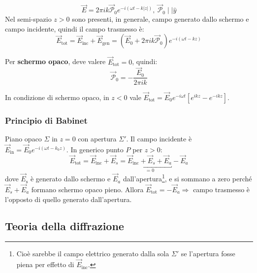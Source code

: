 \documentclass[10pt, a4paper]{scrartcl}
\numberwithin{equation}{subsection}
\theoremstyle{style1}
\newenvironment{boxenv}[1][]{
    \begin{eqbox}[#1]
    }{
   \end{eqbox}
}
\begin{document}
\begin{equation}
	\vec{E} = 2\pi i k \vec{\mathcal{P}}_0 e^{- i (\omega t - k|z|)} , \ \vec{\mathcal{P}}_0  \mid  \mid  \hat{y}
\end{equation}
Nel semi-spazio $z>0$ sono presenti, in generale, campo generato dallo schermo e campo incidente, quindi il campo trasmesso \`e:
\begin{equation}
	\vec{E}_\text{tot} = \vec{E}_\text{inc} + \vec{E}_\text{gen} = (\vec{E}_0 + 2\pi i k \vec{\mathcal{P}}_0) e^{-i(\omega t - kz)} 
\end{equation}
\begin{boxenv}[]
Per \textbf{schermo opaco}, deve valere $\vec{E}_\text{tot} =0 $, quindi:
\begin{equation}
	\vec{\mathcal{P}}_0 =  - \frac{\vec{E}_0}{2\pi i k}
\end{equation}
\end{boxenv}
\noindent In condizione di schermo opaco, in $z<0$ vale $\vec{E}_\text{tot}= \vec{E}_0 e^{-i\omega t}  \left[ e^{ikz} - e^{-ikz}  \right] $.

\subsubsection{Principio di Babinet}

Piano opaco $\Sigma$ in $z=0$ con apertura $\Sigma'$. Il campo incidente \`e $\vec{E}_\text{in} = \vec{E}_0 e^{-i(\omega t - k_0z)} $. In generico punto $P$ per $z>0$:
\begin{equation}
	\vec{E}_\text{tot} = \vec{E}_\text{inc} + \vec{E}_s = \underbracket{\vec{E}_\text{inc} + \vec{E}_s + \vec{E}_a}_{=0}  - \vec{E}_a
\end{equation}
dove $\vec{E}_\text{s}$ \`e generato dallo schermo e $\vec{E}_a$ dall'apertura\footnote{Cio\`e sarebbe il campo elettrico generato dalla sola $\Sigma'$ se l'apertura fosse piena per effetto di $\vec{E}_\text{inc}$.}, e si sommano a zero perch\'e $\vec{E}_s + \vec{E}_a$ formano schermo opaco pieno. Allora $\vec{E}_\text{tot} = - \vec{E}_a\Rightarrow $ campo trasmesso \`e l'opposto di quello generato dall'apertura.
\subsection{Teoria della diffrazione}
\end{document}
